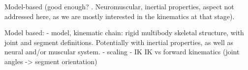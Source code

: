 















Model-based (good enough? \cite{Hicks2015}. Neuromuscular, inertial properties, aspect not addressed here, as we are mostly interested in the kinematics at that stage).

Model based:
- model, kinematic chain: rigid multibody skeletal structure, with joint and segment definitions. Potentially with inertial properties, as well as neural and/or muscular system.
- scaling
- IK
IK vs forward kinematics (joint angles -> segment orientation)




